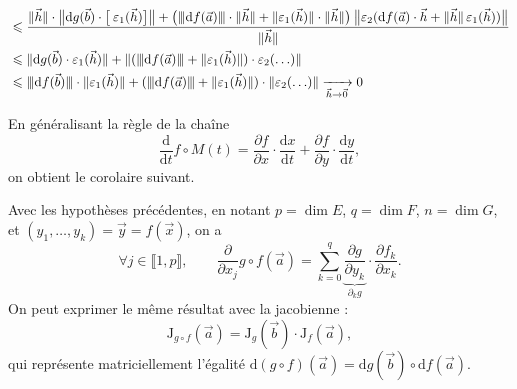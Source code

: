 \begin{prv}
\begin{align*}
			&\le \frac{\|\vec{h}\|\cdot \big\|\mathrm{d}g(\vec{b}) \cdot \big[\:\varepsilon_1(\vec{h})\big]\big\| + \big(\sub{\mathrm{d}f(\vec{a})} \cdot \|\vec{h}\| +\|\varepsilon_1(\vec{h})\| \cdot \|\vec{h}\|\big)\:\big\| \varepsilon_2(\mathrm{d}f(\vec{a}) \cdot \vec{h} + \|\vec{h}\|\,\varepsilon_1(\vec{h}))\big\|}{\|\vec{h}\|}\\
			&\le \|\mathrm{d}g(\vec{b}) \cdot \varepsilon_1(\vec{h})\|+ \|(\sub{\mathrm{d}f(\vec{a})} + \|\varepsilon_1(\vec{h})\|)\cdot \varepsilon_2(\ldots)\|\\
			&\le \sub{\mathrm{d}f(\vec{b})} \cdot \|\varepsilon_1(\vec{h})\|+ (\sub{\mathrm{d}f(\vec{a})} + \|\varepsilon_1(\vec{h})\|) \cdot \|\varepsilon_2(\ldots)\| \tendsto{\vec{h} \to \vec{0}} 0\\
	\end{align*}
\end{prv}

En généralisant la règle de la chaîne \[
	\frac{\mathrm{d}}{\mathrm{d}t} f  \circ M(t) = \frac{\partial f}{\partial x} \cdot \frac{\mathrm{d}x}{\mathrm{d}t} + \frac{\partial f}{\partial y} \cdot \frac{\mathrm{d}y}{\mathrm{d}t}
,\] on obtient le corolaire suivant.

\begin{crlr}
	Avec les hypothèses précédentes, en notant $p = \dim E$, $q = \dim F$, $n = \dim G$, et $(y_1, \ldots, y_k) = \vec{y} = f(\vec{x})$, on a \[
		\forall j \in \llbracket 1,p \rrbracket, \quad\quad \frac{\partial}{\partial x_j} g \circ f(\vec{a}) = \sum_{k=0}^q \underbrace{\frac{\partial g}{\partial y_k}}_{\partial_k g} \cdot \frac{\partial f_k}{\partial x_k}
	.\]
	On peut exprimer le même résultat avec la jacobienne : \[
		\boxed{ \mathrm{J}_{g \circ f}(\vec{a}) = \mathrm{J}_g(\vec{b}) \cdot \mathrm{J}_f(\vec{a}),}
	\]qui représente matriciellement l'égalité $\mathrm{d}(g\circ f)(\vec{a}) = \mathrm{d}g(\vec{b})  \circ \mathrm{d}f(\vec{a})$.
\end{crlr}

